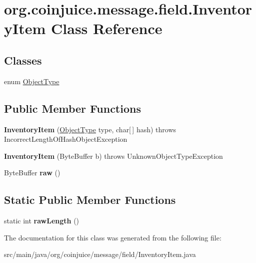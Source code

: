 \hypertarget{classorg_1_1coinjuice_1_1message_1_1field_1_1_inventory_item}{\section{org.\-coinjuice.\-message.\-field.\-Inventory\-Item Class Reference}
\label{classorg_1_1coinjuice_1_1message_1_1field_1_1_inventory_item}
}
\subsection*{Classes}
\begin{DoxyCompactItemize}
\item 
enum \hyperlink{enumorg_1_1coinjuice_1_1message_1_1field_1_1_inventory_item_1_1_object_type}{Object\-Type}
\end{DoxyCompactItemize}
\subsection*{Public Member Functions}
\begin{DoxyCompactItemize}
\item 
\hypertarget{classorg_1_1coinjuice_1_1message_1_1field_1_1_inventory_item_a18ac8970f1eb1cb8ce368edecfa94ee1}{{\bfseries Inventory\-Item} (\hyperlink{enumorg_1_1coinjuice_1_1message_1_1field_1_1_inventory_item_1_1_object_type}{Object\-Type} type, char\mbox{[}$\,$\mbox{]} hash)  throws Incorrect\-Length\-Of\-Hash\-Object\-Exception }\label{classorg_1_1coinjuice_1_1message_1_1field_1_1_inventory_item_a18ac8970f1eb1cb8ce368edecfa94ee1}

\item 
\hypertarget{classorg_1_1coinjuice_1_1message_1_1field_1_1_inventory_item_a481de6d4ef999cb29cb8460044041704}{{\bfseries Inventory\-Item} (Byte\-Buffer b)  throws Unknown\-Object\-Type\-Exception }\label{classorg_1_1coinjuice_1_1message_1_1field_1_1_inventory_item_a481de6d4ef999cb29cb8460044041704}

\item 
\hypertarget{classorg_1_1coinjuice_1_1message_1_1field_1_1_inventory_item_af0e6fffac4fa27ba59b596a7645e54d9}{Byte\-Buffer {\bfseries raw} ()}\label{classorg_1_1coinjuice_1_1message_1_1field_1_1_inventory_item_af0e6fffac4fa27ba59b596a7645e54d9}

\end{DoxyCompactItemize}
\subsection*{Static Public Member Functions}
\begin{DoxyCompactItemize}
\item 
\hypertarget{classorg_1_1coinjuice_1_1message_1_1field_1_1_inventory_item_a8860f55164507b5fe4dd21f8fdca4104}{static int {\bfseries raw\-Length} ()}\label{classorg_1_1coinjuice_1_1message_1_1field_1_1_inventory_item_a8860f55164507b5fe4dd21f8fdca4104}

\end{DoxyCompactItemize}


The documentation for this class was generated from the following file\-:\begin{DoxyCompactItemize}
\item 
src/main/java/org/coinjuice/message/field/Inventory\-Item.\-java\end{DoxyCompactItemize}
